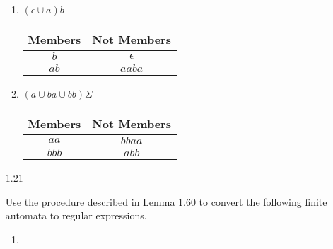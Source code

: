 \begin{enumerate}
\begin{enumerate}
              \item $ (\epsilon  \cup a)b $
                    \begin{table}[H]
                        \centering
                        \begin{tabular}{|c|c|}
                            \hline
                            Members & Not Members \\
                            \hline
                            $b$     & $\epsilon$  \\
                            $ab$    & $aaba$      \\
                            \hline
                        \end{tabular}
                    \end{table}
              \item $(a\cup ba \cup bb)\Sigma$
                    \begin{table}[H]
                        \centering
                        \begin{tabular}{|c|c|}
                            \hline
                            Members & Not Members \\
                            \hline
                            $aa$    & $bbaa$      \\
                            $bbb$   & $abb$       \\
                            \hline
                        \end{tabular}
                    \end{table}
          \end{enumerate}

    \item [1.21]

          Use the procedure described in Lemma 1.60 to convert the following finite automata to regular expressions.
          \begin{enumerate}
              \item

                    \begin{figure}[H]
                        \centering
                    \end{figure}


\end{enumerate}
\end{enumerate}
